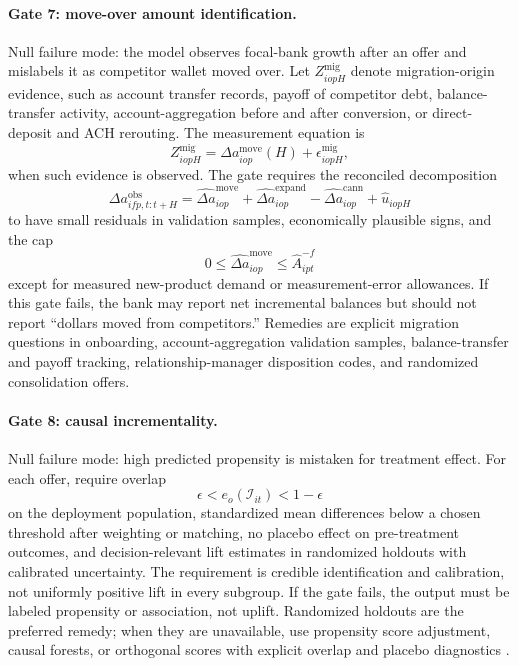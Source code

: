\documentclass[11pt]{article}
\begin{document}
\paragraph{Gate 7: move-over amount identification.}
Null failure mode: the model observes focal-bank growth after an offer and
mislabels it as competitor wallet moved over. Let
$Z_{iopH}^{\mathrm{mig}}$ denote migration-origin evidence, such as account
transfer records, payoff of competitor debt, balance-transfer activity,
account-aggregation before and after conversion, or direct-deposit and ACH
rerouting. The measurement equation is
\[
  Z_{iopH}^{\mathrm{mig}}
  =
  \Delta a_{iop}^{\mathrm{move}}(H)+\epsilon_{iopH}^{\mathrm{mig}},
\]
when such evidence is observed. The gate requires the reconciled decomposition
\[
  \Delta a_{ifp,t:t+H}^{\mathrm{obs}}
  =
  \widehat{\Delta a}_{iop}^{\mathrm{move}}
  +\widehat{\Delta a}_{iop}^{\mathrm{expand}}
  -\widehat{\Delta a}_{iop}^{\mathrm{cann}}
  +\widehat{u}_{iopH}
\]
to have small residuals in validation samples, economically plausible signs,
and the cap
\[
  0\leq \widehat{\Delta a}_{iop}^{\mathrm{move}}
  \leq \widehat{A}_{ipt}^{-f}
\]
except for measured new-product demand or measurement-error allowances. If this
gate fails, the bank may report net incremental balances but should not report
``dollars moved from competitors.'' Remedies are explicit migration questions in
onboarding, account-aggregation validation samples, balance-transfer and payoff
tracking, relationship-manager disposition codes, and randomized consolidation
offers.

\paragraph{Gate 8: causal incrementality.}
Null failure mode: high predicted propensity is mistaken for treatment effect.
For each offer, require overlap
\[
  \epsilon < e_o(\mathcal{I}_{it}) < 1-\epsilon
\]
on the deployment population, standardized mean differences below a chosen
threshold after weighting or matching, no placebo effect on pre-treatment
outcomes, and decision-relevant lift estimates in randomized holdouts with
calibrated uncertainty. The requirement is credible identification and
calibration, not uniformly positive lift in every subgroup. If the gate fails,
the output must be labeled propensity or association, not uplift. Randomized
holdouts are the preferred remedy; when they are unavailable, use propensity
score adjustment, causal forests, or orthogonal scores with explicit overlap
and placebo diagnostics
\citep{rosenbaum1983propensity,lo2002true,wager2018causalforests,chernozhukov2018dml}.
\end{document}
